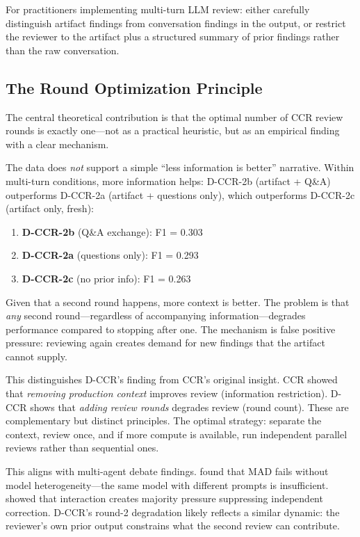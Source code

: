 \documentclass[11pt]{article}
\begin{document}
For practitioners implementing multi-turn LLM review: either carefully distinguish artifact findings from conversation findings in the output, or restrict the reviewer to the artifact plus a structured summary of prior findings rather than the raw conversation.

\subsection{The Round Optimization Principle}

The central theoretical contribution is that the optimal number of CCR review rounds is exactly one---not as a practical heuristic, but as an empirical finding with a clear mechanism.

The data does \emph{not} support a simple ``less information is better'' narrative.
Within multi-turn conditions, more information helps: D-CCR-2b (artifact + Q\&A) outperforms D-CCR-2a (artifact + questions only), which outperforms D-CCR-2c (artifact only, fresh):

\begin{enumerate}
\item \textbf{D-CCR-2b} (Q\&A exchange): F1 = 0.303
\item \textbf{D-CCR-2a} (questions only): F1 = 0.293
\item \textbf{D-CCR-2c} (no prior info): F1 = 0.263
\end{enumerate}

Given that a second round happens, more context is better.
The problem is that \emph{any} second round---regardless of accompanying information---degrades performance compared to stopping after one.
The mechanism is false positive pressure: reviewing again creates demand for new findings that the artifact cannot supply.

This distinguishes D-CCR's finding from CCR's original insight.
CCR showed that \emph{removing production context} improves review (information restriction).
D-CCR shows that \emph{adding review rounds} degrades review (round count).
These are complementary but distinct principles.
The optimal strategy: separate the context, review once, and if more compute is available, run independent parallel reviews rather than sequential ones.

This aligns with multi-agent debate findings.
\citet{zhang2025mad} found that MAD fails without model heterogeneity---the same model with different prompts is insufficient.
\citet{wu2025debate} showed that interaction creates majority pressure suppressing independent correction.
D-CCR's round-2 degradation likely reflects a similar dynamic: the reviewer's own prior output constrains what the second review can contribute.
\end{document}

